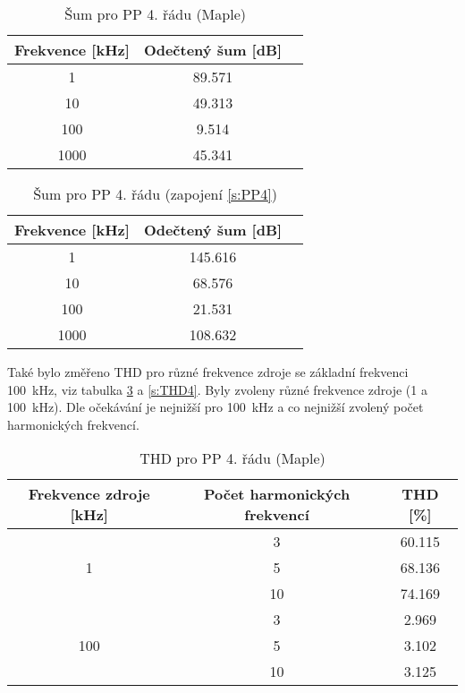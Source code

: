 \begin{table}[h]
\centering
  \begin{tabular}{ | c | c | c |}
    \hline
     Frekvence [kHz] & Odečtený šum [dB] \\ \hline
    1 & 89.571 \\ \hline
    10 & 49.313 \\ \hline
    100 & 9.514 \\ \hline
    1000 & 45.341 \\ \hline
  \end{tabular}
  \caption[Šum pro PP 4. řádu (Maple)]{Šum pro PP 4. řádu (Maple) \label{s:THD1}}
\end{table}
  \begin{table}[h]
\centering
  \begin{tabular}{ | c | c | c |}
    \hline
     Frekvence [kHz] & Odečtený šum [dB] \\ \hline
    1 & 145.616 \\ \hline
    10 & 68.576 \\ \hline
    100 & 21.531 \\ \hline
    1000 & 108.632 \\ \hline
  \end{tabular}
\caption[Šum pro PP 4. řádu]{Šum pro PP 4. řádu (zapojení \ref{s:PP4}) \label{s:THD2}}
\end{table}
\noindent Také bylo změřeno THD pro různé frekvence zdroje se základní frekvenci 100~kHz, viz tabulka \ref{s:THD3} a \ref{s:THD4}. Byly zvoleny různé frekvence zdroje (1 a 100~kHz). Dle očekávání je nejnižší pro 100~kHz a co nejnižší zvolený počet harmonických frekvencí.
\begin{table}[h]
\centering
\renewcommand{\arraystretch}{1.15}
  \begin{tabular}{ | c | c | c |}
    \hline
    Frekvence zdroje [kHz] & Počet harmonických frekvencí & THD [\%] \\ \hline
    \multirow{3}{*}{1} & 3 & 60.115 \\& 5 & 68.136 \\& 10 & 74.169 \\ \hline
	\multirow{3}{*}{100} & 3 & 2.969\\& 5 & 3.102 \\& 10 & 3.125 \\ \hline
  \end{tabular}
  \caption[THD pro PP 4. řádu (Maple)]{THD pro PP 4. řádu (Maple) \label{s:THD3}}
\end{table}
